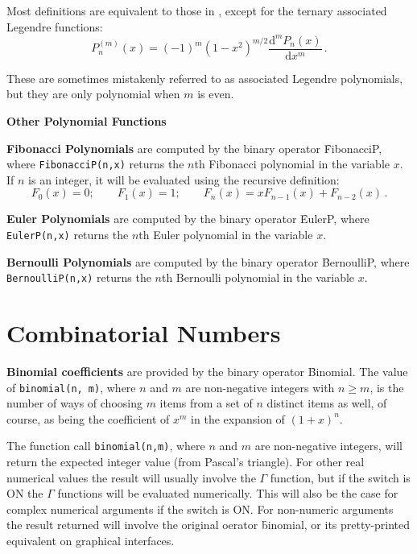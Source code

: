 Most definitions are equivalent to those in \cite{AbramowitzStegun:72},
except for the ternary associated Legendre functions:
\[P_n^{(m)}(x) = (-1)^m(1-x^2)^{m/2}\frac{\mathrm{d}^m P_n(x)}{\mathrm{d}x^m}\,.\]

These are sometimes mistakenly referred to as associated Legendre polynomials,
but they are only polynomial when $m$ is even.

\textbf{Other Polynomial Functions}
\hypertarget{operator:FIBONACCIP}{}

\textbf{Fibonacci Polynomials} are computed by the binary operator
\f{FibonacciP}, where
\texttt{FibonacciP(n,x)} returns the $n$th Fibonacci polynomial
in the variable $x$. If $n$ is an integer, it will be
evaluated using the recursive definition:
\[F_0(x) = 0;\qquad F_1(x) = 1; \qquad F_n(x) = x F_{n-1}(x) + F_{n-2}(x)\,.\]

\textbf{Euler Polynomials} are computed by the binary operator
\f{EulerP}, where\linebreak
\texttt{EulerP(n,x)} returns the $n$th Euler polynomial in the variable $x$.

\textbf{Bernoulli Polynomials} are computed by the binary operator
\f{BernoulliP}, where \texttt{BernoulliP(n,x)} returns the
$n$th Bernoulli polynomial in the variable $x$.

\section{Combinatorial Numbers}
  
\textbf{Binomial coefficients} are provided by the binary operator \f{Binomial}.
The value of \texttt{binomial(n, m)}, where $n$ and $m$ are non-negative
integers with $n \geq m$, is the number of ways of choosing $m$ items from a
set of $n$ distinct items as well, of course, as being the coefficient of $x^m$
in the expansion of $(1+x)^n$.

The function call \texttt{binomial(n,m)}, where $n$ and $m$
are non-negative integers, will return the expected integer value
(from Pascal's triangle). For other real numerical values the result will
usually involve the $\Gamma$ function, but if the switch
 is ON the $\Gamma$ functions will be evaluated numerically.
This will also be the case for complex numerical arguments if the switch
 is ON.  For non-numeric arguments the result returned will
involve the original oerator \f{binomial}, or its pretty-printed equivalent
on graphical interfaces.

